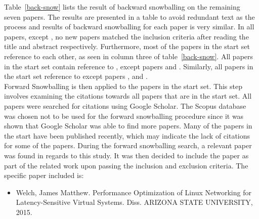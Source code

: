 Table~\ref{back-snow} lists the result of backward snowballing on the remaining seven papers. The results are presented in a table to avoid redundant text as the process and results of backward snowballing for each paper is very similar. In all papers, except \cite{p1}, no new papers matched the inclusion criteria after reading the title and abstract respectively. Furthermore, most of the papers in the start set reference to each other, as seen in column three of table~\ref{back-snow}. All papers in the start set contain reference to \cite{p9}, except papers \cite{2iot} and \cite{p8}. Similarly, all papers in the start set reference to \cite{p6} except papers \cite{p5}, \cite{p6} and \cite{p8}.\\

Forward Snowballing is then applied to the papers in the start set. This step involves examining the citations towards all papers that are in the start set. All papers were searched for citations using Google Scholar. The Scopus database was chosen not to be used for the forward snowballing procedure since it was shown that Google Scholar was able to find more papers. Many of the papers in the start have been published recently, which may indicate the lack of citations for some of the papers. During the forward snowballing search, a relevant paper was found in regards to this study. It was then decided to include the paper as part of the related work upon passing the inclusion and exclusion criteria. The specific paper included is: \\

\begin{itemize}
\item \cite{p10} Welch, James Matthew. Performance Optimization of Linux Networking for Latency-Sensitive Virtual Systems. Diss. ARIZONA STATE UNIVERSITY, 2015.\\
\end{itemize}

